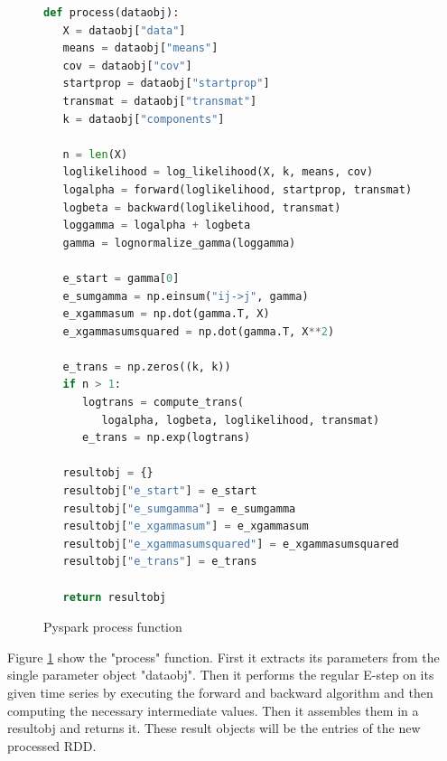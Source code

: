 \begin{figure}
\begin{singlespace}
\begin{lstlisting}[language=Python]
def process(dataobj):
   X = dataobj["data"]
   means = dataobj["means"]
   cov = dataobj["cov"]
   startprop = dataobj["startprop"]
   transmat = dataobj["transmat"]
   k = dataobj["components"]

   n = len(X)
   loglikelihood = log_likelihood(X, k, means, cov)
   logalpha = forward(loglikelihood, startprop, transmat)
   logbeta = backward(loglikelihood, transmat)
   loggamma = logalpha + logbeta
   gamma = lognormalize_gamma(loggamma)

   e_start = gamma[0]
   e_sumgamma = np.einsum("ij->j", gamma)
   e_xgammasum = np.dot(gamma.T, X)
   e_xgammasumsquared = np.dot(gamma.T, X**2)

   e_trans = np.zeros((k, k))
   if n > 1:
      logtrans = compute_trans(
         logalpha, logbeta, loglikelihood, transmat)
      e_trans = np.exp(logtrans)

   resultobj = {}
   resultobj["e_start"] = e_start
   resultobj["e_sumgamma"] = e_sumgamma
   resultobj["e_xgammasum"] = e_xgammasum
   resultobj["e_xgammasumsquared"] = e_xgammasumsquared
   resultobj["e_trans"] = e_trans

   return resultobj
\end{lstlisting}
\end{singlespace}
\caption{Pyspark process function}    
\label{fig:pyspark-process-listing}
\end{figure}

Figure \ref{fig:pyspark-process-listing} show the "process" function. First it extracts its parameters from the single parameter object "dataobj". Then it performs the regular E-step on its given time series by executing the forward and backward algorithm and then computing the necessary intermediate values. Then it assembles them in a resultobj and returns it. These result objects will be the entries of the new processed RDD.